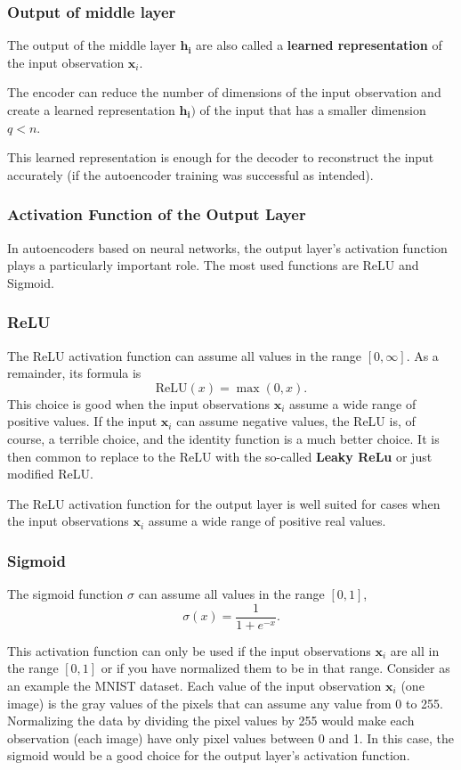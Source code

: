 \documentclass{beamer}
\begin{document}
\begin{frame}
\frametitle{Output of middle layer}

The output of the middle layer
$\mathbf{h}_{\mathbf{i}}$ are also called a \textbf{learned representation} of the input observation $\mathbf{x}_{i}$.

The encoder can reduce the number of dimensions of the input
observation and create a learned representation
$\mathbf{h}_{\mathbf{i}}\mathbf{) }$ of the input that has a smaller
dimension $q<n$.

This learned representation is enough for the decoder to reconstruct
the input accurately (if the autoencoder training was successful as
intended).
\end{frame}

\begin{frame}
\frametitle{Activation Function of the Output Layer}

In autoencoders based on neural networks, the output layer's
activation function plays a particularly important role.  The most
used functions are ReLU and Sigmoid.
\end{frame}

\begin{frame}
\frametitle{ReLU}

The  ReLU activation function can assume all values in the range $\left[0,\infty\right]$. As a remainder, its formula is
\[
\textrm{ReLU}\left(x\right) = \max\left(0,x\right).
\]
This choice is good when the input observations \(\mathbf{x}_{i}\) assume a wide range of positive values.
If the input $\mathbf{x}_{i}$ can assume negative values, the ReLU is, of course, a terrible choice, and the identity function is a much better choice. It is then common to replace to the ReLU with the so-called \textbf{Leaky ReLu} or just modified ReLU.

The ReLU activation function for the output layer is well suited for cases when the input observations \(\mathbf{x}_{i}\) assume a wide range of positive real values.
\end{frame}

\begin{frame}
\frametitle{Sigmoid}

The sigmoid function $\sigma$ can assume all values in the range $[0,1]$,
\[
\sigma\left(x\right) =\frac{1}{1+e^{-x}}.
\]

This activation function can only be used if the input observations
$\mathbf{x}_{i}$ are all in the range $[0,1]$  or if you have
normalized them to be in that range. Consider as an example the MNIST
dataset. Each value of the input observation $\mathbf{x}_{i}$ (one
image) is the gray values of the pixels that can assume any value from
0 to 255. Normalizing the data by dividing the pixel values by 255
would make each observation (each image) have only pixel values
between 0 and 1. In this case, the sigmoid would be a good choice for
the output layer's activation function.
\end{frame}
\end{document}
